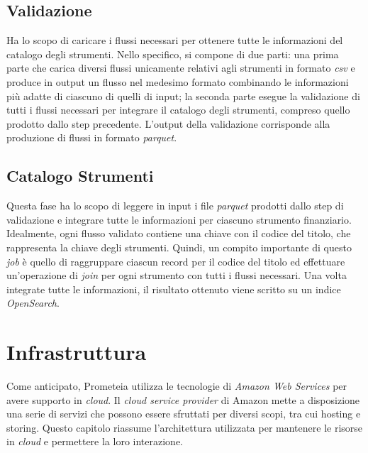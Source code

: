\subsection{Validazione}\label{subsec:bl-validation}
Ha lo scopo di caricare i flussi necessari per ottenere tutte le informazioni del catalogo degli strumenti.
Nello specifico, si compone di due parti:
una prima parte che carica diversi flussi unicamente relativi agli strumenti in formato \textit{csv} e produce in output un flusso nel medesimo formato combinando le informazioni più adatte di ciascuno di quelli di input;
la seconda parte esegue la validazione di tutti i flussi necessari per integrare il catalogo degli strumenti, compreso quello prodotto dallo step precedente.
L'output della validazione corrisponde alla produzione di flussi in formato \textit{parquet}.

\subsection{Catalogo Strumenti}\label{subsec:bl-cat}
Questa fase ha lo scopo di leggere in input i file \textit{parquet} prodotti dallo step di validazione e integrare tutte le informazioni per ciascuno strumento finanziario.
Idealmente, ogni flusso validato contiene una chiave con il codice del titolo, che rappresenta la chiave degli strumenti.
Quindi, un compito importante di questo \textit{job} è quello di raggruppare ciascun record per il codice del titolo ed effettuare un'operazione di \textit{join} per ogni strumento con tutti i flussi necessari.
Una volta integrate tutte le informazioni, il risultato ottenuto viene scritto su un indice \textit{OpenSearch}.

\section{Infrastruttura}\label{sec:infrastructure}

Come anticipato, Prometeia utilizza le tecnologie di \textit{Amazon Web Services} per avere supporto in \textit{cloud}.
Il \textit{cloud service provider} di Amazon mette a disposizione una serie di servizi che possono essere sfruttati per diversi scopi, tra cui hosting e storing.
Questo capitolo riassume l'architettura utilizzata per mantenere le risorse in \textit{cloud} e permettere la loro interazione.

